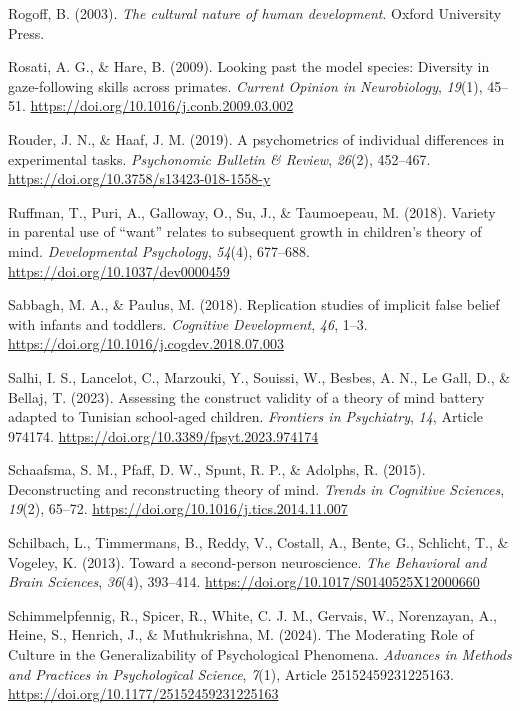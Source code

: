 \documentclass[
]{scrbook}
\newlength{\cslhangindent}
\newenvironment{CSLReferences}[2] %
 {\begin{list}{}{%
  \setlength{\itemindent}{0pt}
  \setlength{\leftmargin}{0pt}
  \setlength{\parsep}{0pt}
  \ifodd #1
   \setlength{\leftmargin}{\cslhangindent}
   \setlength{\itemindent}{-1\cslhangindent}
  \fi
  \setlength{\itemsep}{#2\baselineskip}}}
 {\end{list}}
\begin{document}
\begin{CSLReferences}{1}{0}
Rogoff, B. (2003). \emph{The cultural nature of human development}. Oxford University Press.

Rosati, A. G., \& Hare, B. (2009). Looking past the model species: Diversity in gaze-following skills across primates. \emph{Current Opinion in Neurobiology}, \emph{19}(1), 45--51. \url{https://doi.org/10.1016/j.conb.2009.03.002}

Rouder, J. N., \& Haaf, J. M. (2019). A psychometrics of individual differences in experimental tasks. \emph{Psychonomic Bulletin \& Review}, \emph{26}(2), 452--467. \url{https://doi.org/10.3758/s13423-018-1558-y}

Ruffman, T., Puri, A., Galloway, O., Su, J., \& Taumoepeau, M. (2018). Variety in parental use of {``want''} relates to subsequent growth in children's theory of mind. \emph{Developmental Psychology}, \emph{54}(4), 677--688. \url{https://doi.org/10.1037/dev0000459}

Sabbagh, M. A., \& Paulus, M. (2018). Replication studies of implicit false belief with infants and toddlers. \emph{Cognitive Development}, \emph{46}, 1--3. \url{https://doi.org/10.1016/j.cogdev.2018.07.003}

Salhi, I. S., Lancelot, C., Marzouki, Y., Souissi, W., Besbes, A. N., Le Gall, D., \& Bellaj, T. (2023). Assessing the construct validity of a theory of mind battery adapted to {Tunisian} school-aged children. \emph{Frontiers in Psychiatry}, \emph{14}, Article 974174. \url{https://doi.org/10.3389/fpsyt.2023.974174}

Schaafsma, S. M., Pfaff, D. W., Spunt, R. P., \& Adolphs, R. (2015). Deconstructing and reconstructing theory of mind. \emph{Trends in Cognitive Sciences}, \emph{19}(2), 65--72. \url{https://doi.org/10.1016/j.tics.2014.11.007}

Schilbach, L., Timmermans, B., Reddy, V., Costall, A., Bente, G., Schlicht, T., \& Vogeley, K. (2013). Toward a second-person neuroscience. \emph{The Behavioral and Brain Sciences}, \emph{36}(4), 393--414. \url{https://doi.org/10.1017/S0140525X12000660}

Schimmelpfennig, R., Spicer, R., White, C. J. M., Gervais, W., Norenzayan, A., Heine, S., Henrich, J., \& Muthukrishna, M. (2024). The {Moderating Role} of {Culture} in the {Generalizability} of {Psychological Phenomena}. \emph{Advances in Methods and Practices in Psychological Science}, \emph{7}(1), Article 25152459231225163. \url{https://doi.org/10.1177/25152459231225163}


\end{CSLReferences}
\end{document}
